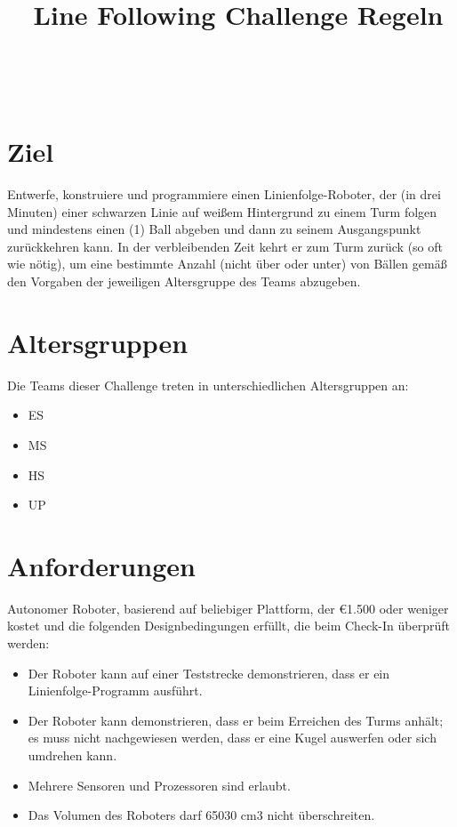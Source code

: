 \documentclass[a4paper,12pt]{article}
\begin{document}


\title{\tagYear\ Line Following Challenge Regeln}
\makeatletter
\let\inserttitle\@title
\makeatother
\begin{center}
	\rrgerLogo
	\huge                      %
	\bfseries                   %
	\\
	\inserttitle
\end{center}

\section{Ziel}
Entwerfe, konstruiere und programmiere einen Linienfolge-Roboter, der (in drei
Minuten) einer schwarzen Linie auf weißem Hintergrund zu einem Turm folgen und
mindestens einen (1) Ball abgeben und dann zu seinem Ausgangspunkt zurückkehren
kann. In der verbleibenden Zeit kehrt er zum Turm zurück (so oft wie nötig), um
eine bestimmte Anzahl (nicht über oder unter) von Bällen gemäß den Vorgaben der
jeweiligen Altersgruppe des Teams abzugeben.

\section{Altersgruppen}

Die Teams dieser Challenge treten in unterschiedlichen Altersgruppen an:
\begin{itemize}
	\item ES
	\item MS
	\item HS
	\item UP
\end{itemize}

\section{Anforderungen}
Autonomer Roboter, basierend auf beliebiger Plattform, der \euro{1.500}  oder
weniger kostet und die folgenden Designbedingungen erfüllt, die beim Check-In
überprüft werden:
\begin{itemize}
	\item Der Roboter kann auf einer Teststrecke demonstrieren, dass er
		ein Linienfolge-Programm ausführt.
	\item Der Roboter kann demonstrieren, dass er beim Erreichen des Turms
		anhält; es muss nicht nachgewiesen werden, dass er eine Kugel
		auswerfen oder sich umdrehen kann.
	\item Mehrere Sensoren und Prozessoren sind erlaubt.
	\item Das Volumen des Roboters darf 65030 cm3 nicht überschreiten.
\end{itemize}
\end{document}
